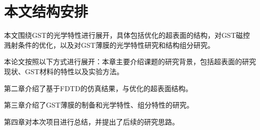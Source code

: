\section{本文结构安排}
本文围绕GST的光学特性进行展开，具体包括优化的超表面的结构，对GST磁控溅射条件的优化，以及对GST薄膜的光学特性研究和结构组分研究。

本论文按照以下方式进行展开：本章主要介绍课题的研究背景，包括超表面的研究现状、GST材料的特性以及实验方法。

第二章介绍了基于FDTD的仿真结果，与优化的超表面结构。

第三章介绍了GST薄膜的制备和光学特性、组分特性的研究。

第四章对本次项目进行总结，并提出了后续的研究思路。